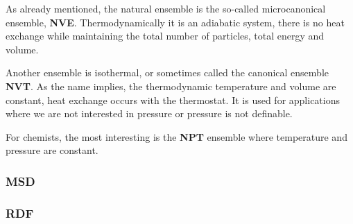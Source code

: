 As already mentioned, the natural ensemble is the so-called microcanonical ensemble, \textbf{NVE}. Thermodynamically it is an adiabatic system, there is no heat exchange while maintaining the total number of particles, total energy and volume. 

Another ensemble is isothermal, or sometimes called the canonical ensemble \textbf{NVT}. As the name implies, the thermodynamic temperature and volume are constant, heat exchange occurs with the thermostat. It is used for applications where we are not interested in pressure or pressure is not definable.

For chemists, the most interesting is the \textbf{NPT} ensemble where temperature and pressure are constant.

\subsubsection{MSD}
\subsubsection{RDF}